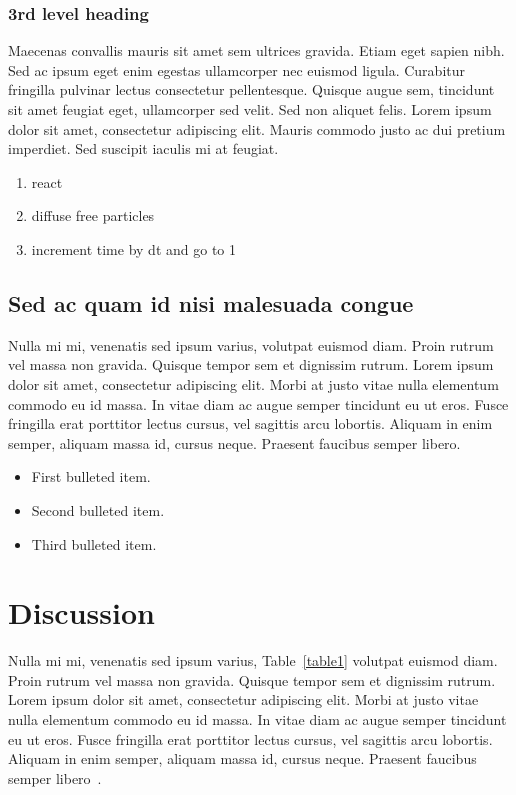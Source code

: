 \documentclass[10pt,letterpaper]{article}
\begin{document}
\subsubsection*{3rd level heading} 
Maecenas convallis mauris sit amet sem ultrices gravida. Etiam eget sapien nibh. Sed ac ipsum eget enim egestas ullamcorper nec euismod ligula. Curabitur fringilla pulvinar lectus consectetur pellentesque. Quisque augue sem, tincidunt sit amet feugiat eget, ullamcorper sed velit. Sed non aliquet felis. Lorem ipsum dolor sit amet, consectetur adipiscing elit. Mauris commodo justo ac dui pretium imperdiet. Sed suscipit iaculis mi at feugiat. 

\begin{enumerate}
	\item{react}
	\item{diffuse free particles}
	\item{increment time by dt and go to 1}
\end{enumerate}


\subsection*{Sed ac quam id nisi malesuada congue}

Nulla mi mi, venenatis sed ipsum varius, volutpat euismod diam. Proin rutrum vel massa non gravida. Quisque tempor sem et dignissim rutrum. Lorem ipsum dolor sit amet, consectetur adipiscing elit. Morbi at justo vitae nulla elementum commodo eu id massa. In vitae diam ac augue semper tincidunt eu ut eros. Fusce fringilla erat porttitor lectus cursus, vel sagittis arcu lobortis. Aliquam in enim semper, aliquam massa id, cursus neque. Praesent faucibus semper libero.

\begin{itemize}
	\item First bulleted item.
	\item Second bulleted item.
	\item Third bulleted item.
\end{itemize}

\section*{Discussion}
Nulla mi mi, venenatis sed ipsum varius, Table~\ref{table1} volutpat euismod diam. Proin rutrum vel massa non gravida. Quisque tempor sem et dignissim rutrum. Lorem ipsum dolor sit amet, consectetur adipiscing elit. Morbi at justo vitae nulla elementum commodo eu id massa. In vitae diam ac augue semper tincidunt eu ut eros. Fusce fringilla erat porttitor lectus cursus, vel sagittis arcu lobortis. Aliquam in enim semper, aliquam massa id, cursus neque. Praesent faucibus semper \cite{drummond2003measurably} libero~\cite{bib3}.
\end{document}
